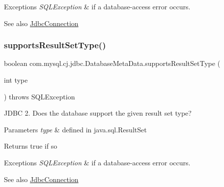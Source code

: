 \begin{DoxyExceptions}{Exceptions}
{\em S\+Q\+L\+Exception} & if a database-\/access error occurs. \\
\hline
\end{DoxyExceptions}
\begin{DoxySeeAlso}{See also}
\mbox{\hyperlink{interfacecom_1_1mysql_1_1cj_1_1jdbc_1_1_jdbc_connection}{Jdbc\+Connection}} 
\end{DoxySeeAlso}
\mbox{\label{classcom_1_1mysql_1_1cj_1_1jdbc_1_1_database_meta_data_a13385ceb5415ae88f636239293f88b8f}} 
\subsubsection{\texorpdfstring{supports\+Result\+Set\+Type()}{supportsResultSetType()}}
{\footnotesize\ttfamily boolean com.\+mysql.\+cj.\+jdbc.\+Database\+Meta\+Data.\+supports\+Result\+Set\+Type (\begin{DoxyParamCaption}\item[{int}]{type }\end{DoxyParamCaption}) throws S\+Q\+L\+Exception}

J\+D\+BC 2. Does the database support the given result set type?


\begin{DoxyParams}{Parameters}
{\em type} & defined in java.\+sql.\+Result\+Set \\
\hline
\end{DoxyParams}
\begin{DoxyReturn}{Returns}
true if so 
\end{DoxyReturn}

\begin{DoxyExceptions}{Exceptions}
{\em S\+Q\+L\+Exception} & if a database-\/access error occurs. \\
\hline
\end{DoxyExceptions}
\begin{DoxySeeAlso}{See also}
\mbox{\hyperlink{interfacecom_1_1mysql_1_1cj_1_1jdbc_1_1_jdbc_connection}{Jdbc\+Connection}} 
\end{DoxySeeAlso}
\mbox{\label{classcom_1_1mysql_1_1cj_1_1jdbc_1_1_database_meta_data_a95949baa3d0b11c7517ef35911461e7b}} 
